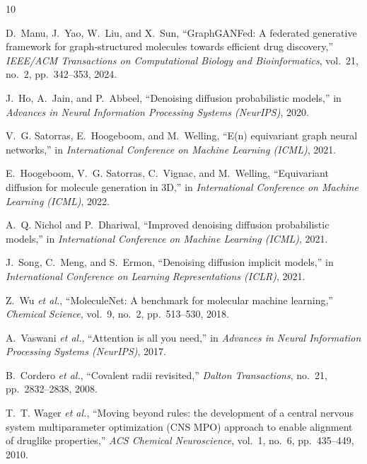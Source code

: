 \documentclass[12pt, a4paper]{article}
\begin{document}
\begin{thebibliography}{10}

D.~Manu, J.~Yao, W.~Liu, and X.~Sun, ``GraphGANFed: A federated generative framework for graph-structured molecules towards efficient drug discovery,'' \textit{IEEE/ACM Transactions on Computational Biology and Bioinformatics}, vol.~21, no.~2, pp.~342--353, 2024.

J.~Ho, A.~Jain, and P.~Abbeel, ``Denoising diffusion probabilistic models,'' in \textit{Advances in Neural Information Processing Systems (NeurIPS)}, 2020.

V.~G. Satorras, E.~Hoogeboom, and M.~Welling, ``E(n) equivariant graph neural networks,'' in \textit{International Conference on Machine Learning (ICML)}, 2021.

E.~Hoogeboom, V.~G. Satorras, C.~Vignac, and M.~Welling, ``Equivariant diffusion for molecule generation in 3D,'' in \textit{International Conference on Machine Learning (ICML)}, 2022.

A.~Q. Nichol and P.~Dhariwal, ``Improved denoising diffusion probabilistic models,'' in \textit{International Conference on Machine Learning (ICML)}, 2021.

J.~Song, C.~Meng, and S.~Ermon, ``Denoising diffusion implicit models,'' in \textit{International Conference on Learning Representations (ICLR)}, 2021.

Z.~Wu \textit{et al.}, ``MoleculeNet: A benchmark for molecular machine learning,'' \textit{Chemical Science}, vol.~9, no.~2, pp.~513--530, 2018.

A.~Vaswani \textit{et al.}, ``Attention is all you need,'' in \textit{Advances in Neural Information Processing Systems (NeurIPS)}, 2017.

B.~Cordero \textit{et al.}, ``Covalent radii revisited,'' \textit{Dalton Transactions}, no.~21, pp.~2832--2838, 2008.

T.~T. Wager \textit{et al.}, ``Moving beyond rules: the development of a central nervous system multiparameter optimization (CNS MPO) approach to enable alignment of druglike properties,'' \textit{ACS Chemical Neuroscience}, vol.~1, no.~6, pp.~435--449, 2010.

\end{thebibliography}
\end{document}
